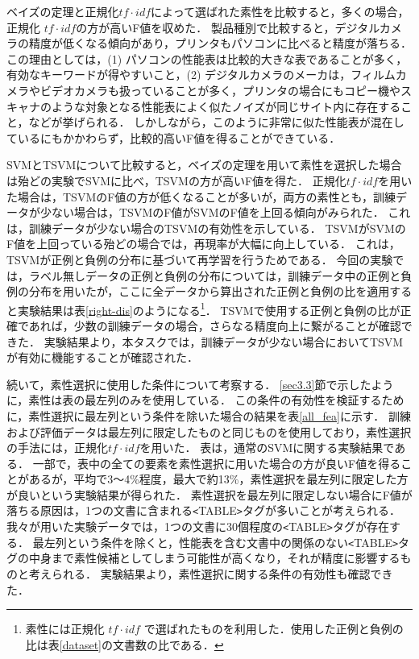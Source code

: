 ベイズの定理と正規化$tf \cdot idf$によって選ばれた素性を比較すると，多くの場合，正規化 $tf \cdot idf$の方が高いF値を収めた．
製品種別で比較すると，デジタルカメラの精度が低くなる傾向があり，プリンタもパソコンに比べると精度が落ちる．
この理由としては，(1) パソコンの性能表は比較的大きな表であることが多く，有効なキーワードが得やすいこと，(2) デジタルカメラのメーカは，フィルムカメラやビデオカメラも扱っていることが多く，プリンタの場合にもコピー機やスキャナのような対象となる性能表によく似たノイズが同じサイト内に存在すること，などが挙げられる．
しかしながら，このように非常に似た性能表が混在しているにもかかわらず，比較的高いF値を得ることができている．

SVMとTSVMについて比較すると，ベイズの定理を用いて素性を選択した場合は殆どの実験でSVMに比べ，TSVMの方が高いF値を得た．
正規化$tf \cdot idf$を用いた場合は，TSVMのF値の方が低くなることが多いが，両方の素性とも，訓練データが少ない場合は，TSVMのF値がSVMのF値を上回る傾向がみられた．
これは，訓練データが少ない場合のTSVMの有効性を示している．
TSVMがSVMのF値を上回っている殆どの場合では，再現率が大幅に向上している．
これは，TSVMが正例と負例の分布に基づいて再学習を行うためである．
今回の実験では，ラベル無しデータの正例と負例の分布については，訓練データ中の正例と負例の分布を用いたが，ここに全データから算出された正例と負例の比を適用すると実験結果は表\ref{right-dis}のようになる\footnote{素性には正規化 $tf \cdot idf$ で選ばれたものを利用した．使用した正例と負例の比は表\ref{dataset}の文書数の比である．}．
TSVMで使用する正例と負例の比が正確であれば，少数の訓練データの場合，さらなる精度向上に繋がることが確認できた．
実験結果より，本タスクでは，訓練データが少ない場合においてTSVMが有効に機能することが確認された．

続いて，素性選択に使用した条件について考察する．
\ref{sec3.3}節で示したように，素性は表の最左列のみを使用している．
この条件の有効性を検証するために，素性選択に最左列という条件を除いた場合の結果を表\ref{all_fea}に示す．
訓練および評価データは最左列に限定したものと同じものを使用しており，素性選択の手法には，正規化$tf \cdot idf$を用いた．
表は，通常のSVMに関する実験結果である．
一部で，表中の全ての要素を素性選択に用いた場合の方が良いF値を得ることがあるが，平均で3〜4\%程度，最大で約13\%，素性選択を最左列に限定した方が良いという実験結果が得られた．
素性選択を最左列に限定しない場合にF値が落ちる原因は，1つの文書に含まれる\verb+<+TABLE\verb+>+タグが多いことが考えられる．
我々が用いた実験データでは，1つの文書に30個程度の\verb+<+TABLE\verb+>+タグが存在する．
最左列という条件を除くと，性能表を含む文書中の関係のない\verb+<+TABLE\verb+>+タグの中身まで素性候補としてしまう可能性が高くなり，それが精度に影響するものと考えられる．
実験結果より，素性選択に関する条件の有効性も確認できた．

